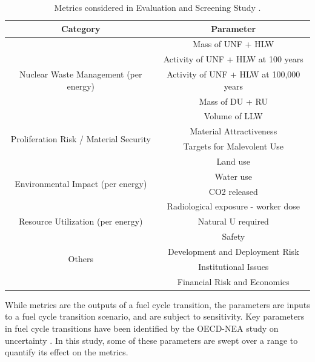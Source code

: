 \documentclass{article}
\begin{document}
\begin{table}[h]
    \centering
    \caption{Metrics considered in Evaluation and Screening
                Study \cite{wigeland_nuclear_2014}.}
    \begin{tabular}{cc}
        \hline
        \textbf{Category} & \textbf{Parameter} \\ \hline
        \multirow{5}{*}{Nuclear Waste Management (per energy)} & Mass of \gls{UNF} + \gls{HLW} \\
         & Activity of \gls{UNF} + \gls{HLW} at 100 years \\
         & Activity of \gls{UNF} + \gls{HLW} at 100,000 years \\
         & Mass of \gls{DU} + \gls{RU}\\
         & Volume of \gls{LLW} \\ \hline
        \multirow{2}{*}{Proliferation Risk / Material Security} & Material Attractiveness \\
         & Targets for Malevolent Use \\ \hline
        \multirow{4}{*}{Environmental Impact (per energy)} & Land use \\
        & Water use \\
        & CO2 released\\
        & Radiological exposure - worker dose\\ \hline

        \multirow{1}{*}{Resource Utilization (per energy)} & Natural U required \\ \hline

        \multirow{4}{*}{Others} & Safety \\
        & Development and Deployment Risk \\
        & Institutional Issues\\
        & Financial Risk and Economics \\ \hline
    \end{tabular}
\end{table}


While metrics are the outputs of a fuel cycle transition, the parameters
are inputs to a fuel cycle transition scenario, and are subject to
sensitivity. Key parameters in fuel cycle transitions have been identified
by the OECD-NEA study on uncertainty \cite{hyland_effects_2015}. In this
study, some of these parameters are swept over a range to quantify its
effect on the metrics.
\end{document}
